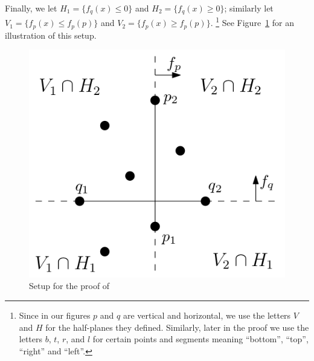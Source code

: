 \documentclass{amsart}
\theoremstyle{plain}
\theoremstyle{definition}
\newcommand{\conv}{\ensuremath{\mathrm{conv}}\hspace{1pt}}
\begin{document}
Finally, we let $H_1=\{f_q(x) \leq 0\}$ and $H_2=\{f_q(x) \geq 0\}$; similarly let $V_1=\{f_p(x) \leq f_p(p)\}$ and $V_2=\{f_p(x) \geq f_p(p)\}$.%
\footnote{Since in our figures $p$ and $q$ are vertical and horizontal, we use the letters $V$ and $H$ for the half-planes they defined. Similarly, later in the proof we use the letters $b$, $t$, $r$, and $l$ for certain  points and segments meaning ``bottom'', ``top'', ``right'' and ``left''.}
See Figure~\ref{fig:setup} for an illustration of this setup.
%
\begin{figure}[htb]
\includegraphics[scale=.3]{setup.png}
\caption{Setup for the proof of }
\label{fig:setup}
\end{figure}

%
\end{document}
